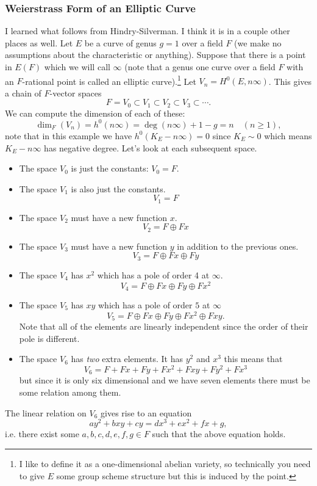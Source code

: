 \documentclass[12pt]{article}
\numberwithin{equation}{section}
\theoremstyle{definition}
\theoremstyle{remark}
\begin{document}
\subsubsection{Weierstrass Form of an Elliptic Curve}\label{S:weierstrass}
I learned what follows from Hindry-Silverman. I think it is in a couple other places as well.
Let $E$ be a curve of genus $g=1$ over a field $F$ (we make no assumptions about the characteristic or anything). 
Suppose that there is a point in $E(F)$ which we will call $\infty$ (note that a genus one curve over a field $F$ with an $F$-rational point is called an elliptic curve).\footnote{I like to define it as a one-dimensional abelian variety, so technically you need to give $E$ some group scheme structure but this is induced by the point.}
Let $V_n = H^0(E,n\infty)$. 
This gives a chain of $F$-vector spaces 
 $$ F=V_0 \subset V_1 \subset V_2 \subset V_3 \subset \cdots. $$
We can compute the dimension of each of these:
 $$ \dim_F(V_n) = h^0(n\infty) = \deg(n\infty)+1-g= n \quad (n\geq 1), $$
note that in this example we have $h^0(K_E-n\infty)=0$ since $K_E\sim 0$ which means $K_E-n\infty$ has negative degree.
Let's look at each subsequent space.
\begin{itemize}
	\item The space $V_0$ is just the constants: $V_0=F$.
	\item The space $V_1$ is also just the constants.
	 $$ V_1=F$$
	\item The space $V_2$ must have a new function $x$.
	 $$ V_2 = F \oplus Fx $$
	\item The space $V_3$ must have a new function $y$ in addition to the previous ones.
	 $$ V_3 = F \oplus Fx \oplus Fy $$
	\item The space $V_4$ has $x^2$ which has a pole of order 4 at $\infty$.
	 $$ V_4 = F\oplus Fx \oplus Fy \oplus Fx^2 $$
	\item The space $V_5$ has $xy$ which has a pole of order $5$ at $\infty$
	$$V_5 = F\oplus Fx \oplus Fy \oplus Fx^2 \oplus Fxy. $$
	Note that all of the elements are linearly independent since the order of their pole is different.
	\item The space $V_6$ has \emph{two} extra elements. It has $y^2$ and $x^3$ this means that 
	$$ V_6 = F + Fx + Fy + Fx^2 + Fxy+ F y^2+Fx^3$$ 
	but since it is only six dimensional and we have seven elements there must be some relation among them.
\end{itemize}
The linear relation on $V_6$ gives rise to an equation 
 $$ a y^2 + bxy+cy=dx^3+ex^2+fx+g,$$
i.e. there exist some $a,b,c,d,e,f,g\in F$ such that the above equation holds.
\end{document}

